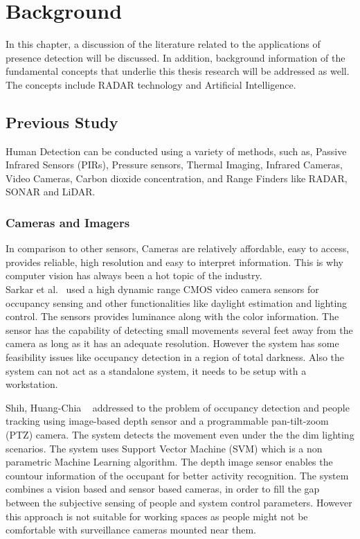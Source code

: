 \chapter{Background}
\label{chapter:background} 
In this chapter, a discussion of the literature related to the applications of presence detection will be discussed. In addition, background information of the fundamental concepts that underlie this thesis research will be addressed as well. The concepts include  RADAR  technology and Artificial Intelligence.


\section{Previous Study}
Human Detection can be conducted using a variety of methods, such as, Passive Infrared Sensors (PIRs), Pressure sensors, Thermal Imaging, Infrared Cameras, Video Cameras, Carbon dioxide concentration, and Range Finders like RADAR, SONAR and LiDAR.

\subsection{Cameras and Imagers}
In comparison to other sensors, Cameras are relatively affordable, easy to access, provides reliable, high resolution and easy to interpret information. This is why computer vision has always been a hot topic of the industry.
\\

Sarkar et al.~\cite{sarkar2008integrated} used a high dynamic range CMOS video camera sensors for occupancy sensing and other functionalities like daylight estimation and lighting control. The sensors provides luminance along with the color information. The sensor has the capability of detecting small movements several feet away from the camera as long as it has an adequate resolution. However the system has some feasibility issues like occupancy detection in a region of total darkness. Also the system can not act as a standalone system, it needs to be setup with a workstation.

Shih, Huang-Chia ~\cite{shih2014robust} addressed to the problem of occupancy detection and people  tracking using image-based depth sensor and a programmable pan-tilt-zoom (PTZ) camera.
The system detects the movement even under the the dim lighting scenarios. The system uses Support Vector Machine (SVM) which is a non parametric Machine Learning algorithm. The depth image sensor enables the countour information of the occupant for better activity recognition. The system combines a vision based and sensor based cameras, in order to fill the gap between the subjective sensing of people and system control parameters. 
However this approach is not suitable for working spaces as people might not be comfortable with surveillance cameras mounted near them.
\\

